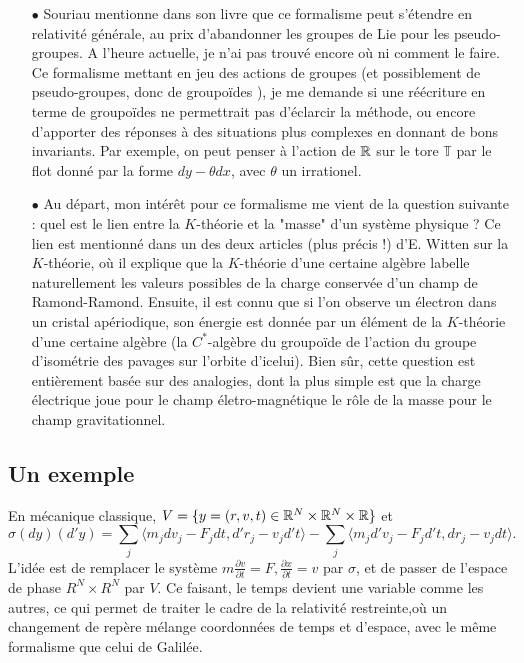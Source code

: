 \begin{itemize}
\item[$\bullet$] Souriau mentionne dans son livre que ce formalisme peut s'étendre en relativité générale, au prix d'abandonner les groupes de Lie pour les pseudo-groupes. A l'heure actuelle, je n'ai pas trouvé encore où ni comment le faire. Ce formalisme mettant en jeu des actions de groupes (et possiblement de pseudo-groupes, donc de groupoïdes ), je me demande si une réécriture en terme de groupoïdes ne permettrait pas d'éclarcir la méthode, ou encore d'apporter des réponses à des situations plus complexes en donnant de bons invariants. Par exemple, on peut penser à l'action de $\mathbb R$ sur le tore $\mathbb T$ par le flot donné par la forme $dy-\theta dx$, avec $\theta$ un irrationel.

\item[$\bullet$] Au départ, mon intérêt pour ce formalisme me vient de la question suivante : quel est le lien entre la $K$-théorie et la "masse" d'un système physique ? Ce lien est mentionné dans un des deux articles (plus précis !) d'E. Witten sur la $K$-théorie, où il explique que la $K$-théorie d'une certaine algèbre labelle naturellement les valeurs possibles de la charge conservée d'un champ de Ramond-Ramond. Ensuite, il est connu que si l'on observe un électron dans un cristal apériodique, son énergie est donnée par un élément de la $K$-théorie d'une certaine algèbre (la $C^*$-algèbre du groupoïde de l'action du groupe d'isométrie des pavages sur l'orbite d'icelui). Bien sûr, cette question est entièrement basée sur des analogies, dont la plus simple est que la charge électrique joue pour le champ életro-magnétique le rôle de la masse pour le champ gravitationnel. 
\end{itemize}

\subsection{Un exemple}

En mécanique classique, $V=\{y=(r,v,t)\in \mathbb R^N\times \mathbb R^N\times \mathbb R\}$ et \[\sigma(dy)(d'y)=\sum_j \langle m_jdv_j - F_jdt , d'r_j-v_j d't\rangle-\sum_j \langle m_j d'v_j -F_j d't, dr_j-v_j dt \rangle.\]
L'idée est de remplacer le système $m\frac{\partial v}{\partial t} = F,\frac{\partial x}{\partial t} =v$ par $\sigma$, et de passer de l'espace de phase $R^N\times R^N$ par $V$. Ce faisant, le temps devient une variable comme les autres, ce qui permet de traiter le cadre de la relativité restreinte,où un changement de repère mélange coordonnées de temps et d'espace, avec le même formalisme que celui de Galilée.\\

